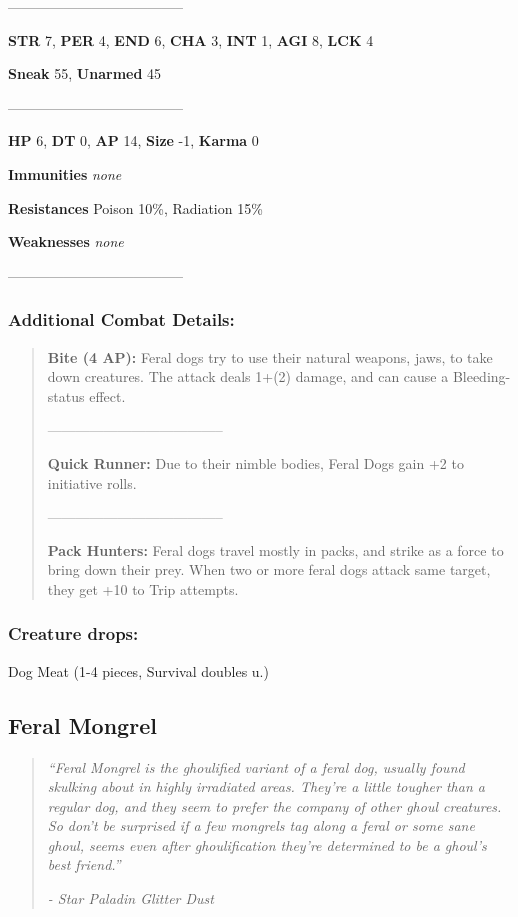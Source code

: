 \documentclass[11pt,a4paper,twocolumn]{book}
\begin{document}
	--------------------------------------
	
	\noindent
	\textbf{STR} 7, \textbf{PER} 4, \textbf{END} 6, \textbf{CHA} 3, \textbf{INT} 1, \textbf{AGI} 8, \textbf{LCK} 4
	
	\noindent
	\textbf{Sneak} 55, \textbf{Unarmed} 45
	
	--------------------------------------
	
	\noindent
	\textbf{HP} 6, \textbf{DT} 0, \textbf{AP} 14, \textbf{Size} -1, \textbf{Karma} 0
	
	
	\noindent
	\textbf{Immunities} \emph{none}
	
	\noindent
	\textbf{Resistances} Poison 10\%, Radiation 15\%
	
	\noindent
	\textbf{Weaknesses} \emph{none} %
	
	--------------------------------------
	
	\subsubsection*{Additional Combat Details:}
	\begin{verse}
		\textbf{Bite (4 AP):} Feral dogs try to use their natural weapons, jaws, to take down creatures. The attack deals 1+(2) damage, and can cause a Bleeding-status effect.
		
		--------------------------------------
		
		\textbf{Quick Runner:} Due to their nimble bodies, Feral Dogs gain +2 to initiative rolls.
		
		--------------------------------------
		
		\textbf{Pack Hunters:} Feral dogs travel mostly in packs, and strike as a force to bring down their prey. When two or more feral dogs attack same target, they get +10 to Trip attempts.

	\end{verse}
	
	\subsubsection*{Creature drops:}
	Dog Meat (1-4 pieces, Survival doubles u.)
	
	\vfill
	\subsection*{Feral Mongrel}
	\begin{quote}
		\emph{``Feral Mongrel is the ghoulified variant of a feral dog, usually found skulking about in highly irradiated areas. They're a little tougher than a regular dog, and they seem to prefer the company of other ghoul creatures. So don't be surprised if a few mongrels tag along a feral or some sane ghoul, seems even after ghoulification they're determined to be a ghoul's best friend.''}
		
		\emph{-	Star Paladin Glitter Dust}
	\end{quote}
	
\end{document}
